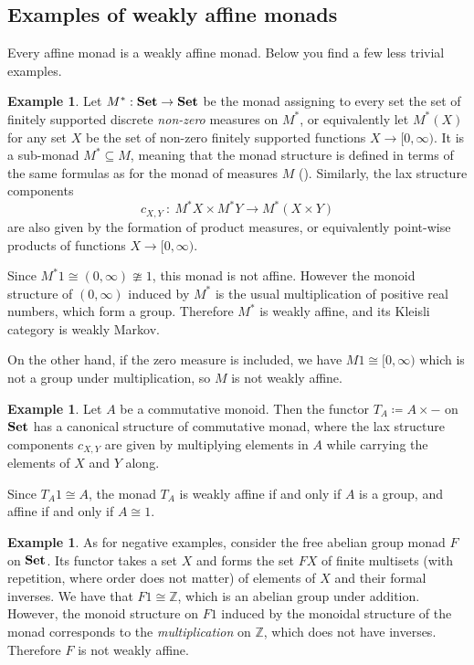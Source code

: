 \documentclass[a4paper,UKenglish,numberwithinsect,cleveref, autoref, thm-restate]{lipics-v2021}
\theoremstyle{plain} %
\theoremstyle{definition} %
\newtheorem{myexample}[mytheorem]{Example}
\begin{document}
\subsection{Examples of weakly affine monads} 
\label{secexamples}

Every affine monad is a weakly affine monad. Below you find a few less trivial examples.

\begin{myexample}
    \label{ex:nonzero_measures}
	Let $M^* : \mathbf{Set} \to \mathbf{Set}$ be the monad assigning to every set the set of finitely supported discrete \emph{non-zero}
	measures on $M^*$, or equivalently let $M^*(X)$ for any set $X$ be the set of non-zero finitely supported functions $X \to [0,\infty)$.
	It is a sub-monad $M^* \subseteq M$, meaning that the monad structure is defined in terms of the same formulas as for the monad of measures $M$ ().
	Similarly, the lax structure components
	\[
		c_{X,Y} \: : \: M^* X \times M^* Y \longrightarrow M^*(X \times Y)
	\]
	are also given by the formation of product measures, or equivalently point-wise products of functions 
	$X \to [0,\infty)$.

	Since $M^* 1 \cong (0,\infty)\ncong 1$, this monad is not affine. However the monoid structure of $(0,\infty)$ induced by $M^*$ is the usual multiplication of positive real numbers, which form a group. Therefore $M^*$ is weakly affine, and its Kleisli category is weakly Markov.

	On the other hand, if the zero measure is included, we have $M1 \cong [0,\infty)$ which is not a group under multiplication, so $M$ is not weakly affine.
\end{myexample}

\begin{myexample}
	\label{ex:abelian_group}
	Let $A$ be a commutative monoid.
	Then the functor $T_A \coloneqq A \times -$ on $\mathbf{Set}$ has a canonical structure of commutative monad, 
	where the lax structure components $c_{X,Y}$ are given by multiplying elements in $A$ while carrying the elements 
	of $X$ and $Y$ along.

	Since $T_A 1 \cong A$, the monad $T_A$ is weakly affine if and only if $A$ is a group, and affine if and only if $A\cong 1$.
\end{myexample}

\begin{myexample}
    \label{ex:nonexample}
    As for negative examples,
    consider the free abelian group monad $F$ on $\mathbf{Set}$. Its functor takes a set $X$ and forms the set $FX$ of finite multisets (with repetition, where order does not matter) of elements of $X$ and their formal inverses. 
    We have that $F1\cong \mathbb{Z}$, which is an abelian group under addition. 
    However, the monoid structure on $F1$ induced by the monoidal structure of the monad corresponds to the \emph{multiplication} on $\mathbb{Z}$, which does not have inverses. Therefore $F$ is not weakly affine. 
\end{myexample}
\end{document}
